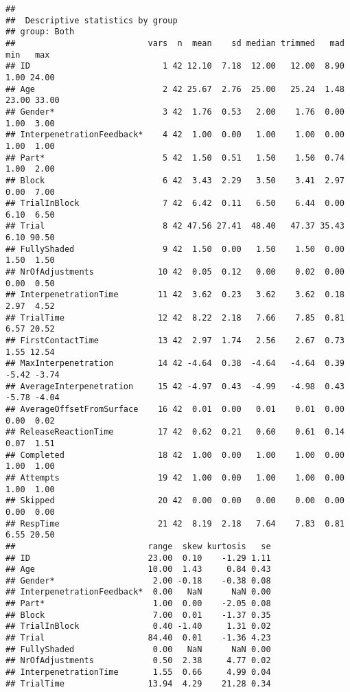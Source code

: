 \documentclass[
]{article}
\begin{document}
\begin{verbatim}
## 
##  Descriptive statistics by group 
## group: Both
##                           vars  n  mean    sd median trimmed   mad   min   max
## ID                           1 42 12.10  7.18  12.00   12.00  8.90  1.00 24.00
## Age                          2 42 25.67  2.76  25.00   25.24  1.48 23.00 33.00
## Gender*                      3 42  1.76  0.53   2.00    1.76  0.00  1.00  3.00
## InterpenetrationFeedback*    4 42  1.00  0.00   1.00    1.00  0.00  1.00  1.00
## Part*                        5 42  1.50  0.51   1.50    1.50  0.74  1.00  2.00
## Block                        6 42  3.43  2.29   3.50    3.41  2.97  0.00  7.00
## TrialInBlock                 7 42  6.42  0.11   6.50    6.44  0.00  6.10  6.50
## Trial                        8 42 47.56 27.41  48.40   47.37 35.43  6.10 90.50
## FullyShaded                  9 42  1.50  0.00   1.50    1.50  0.00  1.50  1.50
## NrOfAdjustments             10 42  0.05  0.12   0.00    0.02  0.00  0.00  0.50
## InterpenetrationTime        11 42  3.62  0.23   3.62    3.62  0.18  2.97  4.52
## TrialTime                   12 42  8.22  2.18   7.66    7.85  0.81  6.57 20.52
## FirstContactTime            13 42  2.97  1.74   2.56    2.67  0.73  1.55 12.54
## MaxInterpenetration         14 42 -4.64  0.38  -4.64   -4.64  0.39 -5.42 -3.74
## AverageInterpenetration     15 42 -4.97  0.43  -4.99   -4.98  0.43 -5.78 -4.04
## AverageOffsetFromSurface    16 42  0.01  0.00   0.01    0.01  0.00  0.00  0.02
## ReleaseReactionTime         17 42  0.62  0.21   0.60    0.61  0.14  0.07  1.51
## Completed                   18 42  1.00  0.00   1.00    1.00  0.00  1.00  1.00
## Attempts                    19 42  1.00  0.00   1.00    1.00  0.00  1.00  1.00
## Skipped                     20 42  0.00  0.00   0.00    0.00  0.00  0.00  0.00
## RespTime                    21 42  8.19  2.18   7.64    7.83  0.81  6.55 20.50
##                           range  skew kurtosis   se
## ID                        23.00  0.10    -1.29 1.11
## Age                       10.00  1.43     0.84 0.43
## Gender*                    2.00 -0.18    -0.38 0.08
## InterpenetrationFeedback*  0.00   NaN      NaN 0.00
## Part*                      1.00  0.00    -2.05 0.08
## Block                      7.00  0.01    -1.37 0.35
## TrialInBlock               0.40 -1.40     1.31 0.02
## Trial                     84.40  0.01    -1.36 4.23
## FullyShaded                0.00   NaN      NaN 0.00
## NrOfAdjustments            0.50  2.38     4.77 0.02
## InterpenetrationTime       1.55  0.66     4.99 0.04
## TrialTime                 13.94  4.29    21.28 0.34

\end{verbatim}
\end{document}
